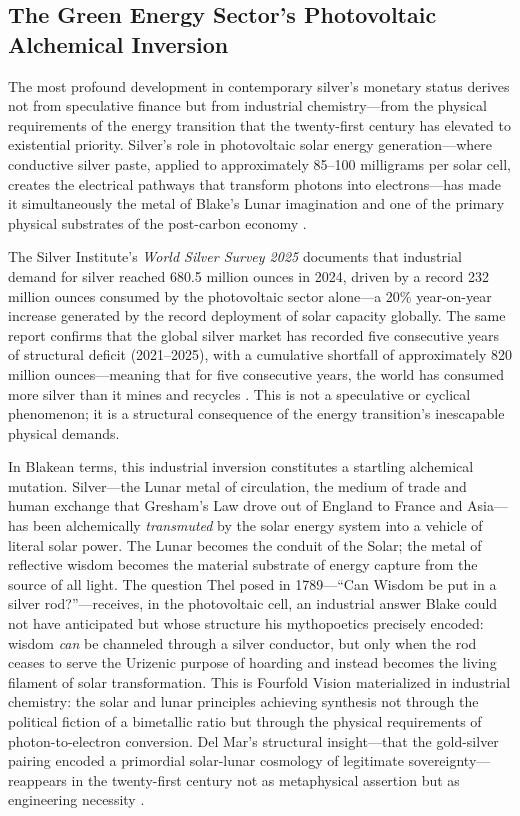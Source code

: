 \documentclass[
]{article}
\begin{document}
\subsection{The Green Energy Sector's Photovoltaic Alchemical
Inversion}\label{the-green-energy-sectors-photovoltaic-alchemical-inversion}

The most profound development in contemporary silver's monetary status
derives not from speculative finance but from industrial
chemistry---from the physical requirements of the energy transition that
the twenty-first century has elevated to existential priority. Silver's
role in photovoltaic solar energy generation---where conductive silver
paste, applied to approximately 85--100 milligrams per solar cell,
creates the electrical pathways that transform photons into
electrons---has made it simultaneously the metal of Blake's Lunar
imagination and one of the primary physical substrates of the
post-carbon economy \citep{silverinstitute2025world}.

The Silver Institute's \emph{World Silver Survey 2025} documents that
industrial demand for silver reached 680.5 million ounces in 2024,
driven by a record 232 million ounces consumed by the photovoltaic
sector alone---a 20\% year-on-year increase generated by the record
deployment of solar capacity globally. The same report confirms that the
global silver market has recorded five consecutive years of structural
deficit (2021--2025), with a cumulative shortfall of approximately 820
million ounces---meaning that for five consecutive years, the world has
consumed more silver than it mines and recycles
\citep{silverinstitute2025world}. This is not a speculative or cyclical
phenomenon; it is a structural consequence of the energy transition's
inescapable physical demands.

In Blakean terms, this industrial inversion constitutes a startling
alchemical mutation. Silver---the Lunar metal of circulation, the medium
of trade and human exchange that Gresham's Law drove out of England to
France and Asia---has been alchemically \emph{transmuted} by the solar
energy system into a vehicle of literal solar power. The Lunar becomes
the conduit of the Solar; the metal of reflective wisdom becomes the
material substrate of energy capture from the source of all light. The
question Thel posed in 1789---``Can Wisdom be put in a silver
rod?''---receives, in the photovoltaic cell, an industrial answer Blake
could not have anticipated but whose structure his mythopoetics
precisely encoded: wisdom \emph{can} be channeled through a silver
conductor, but only when the rod ceases to serve the Urizenic purpose of
hoarding and instead becomes the living filament of solar
transformation. This is Fourfold Vision materialized in industrial
chemistry: the solar and lunar principles achieving synthesis not
through the political fiction of a bimetallic ratio but through the
physical requirements of photon-to-electron conversion. Del Mar's
structural insight---that the gold-silver pairing encoded a primordial
solar-lunar cosmology of legitimate sovereignty---reappears in the
twenty-first century not as metaphysical assertion but as engineering
necessity \citep{delmar1895history}.
\end{document}
